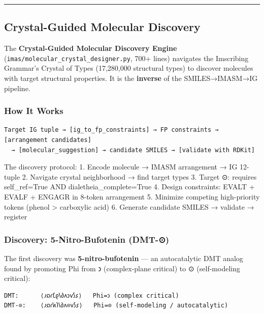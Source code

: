 \documentclass[12pt,a4paper]{article}
\begin{document}
\begin{center}\rule{0.5\linewidth}{0.5pt}\end{center}

\hypertarget{crystal-guided-molecular-discovery}{%
\subsection{Crystal-Guided Molecular
Discovery}\label{crystal-guided-molecular-discovery}}

The \textbf{Crystal-Guided Molecular Discovery Engine}
(\texttt{imas/molecular\_crystal\_designer.py}, 700+ lines) navigates
the Imscribing Grammar's Crystal of Types (17,280,000 structural types)
to discover molecules with target structural properties. It is the
\textbf{inverse} of the SMILES→IMASM→IG pipeline.

\hypertarget{how-it-works}{%
\subsubsection{How It Works}\label{how-it-works}}

\begin{verbatim}
Target IG tuple → [ig_to_fp_constraints] → FP constraints → [arrangement candidates]
  → [molecular_suggestion] → candidate SMILES → [validate with RDKit]
\end{verbatim}

The discovery protocol: 1. Encode molecule → IMASM arrangement → IG
12-tuple 2. Navigate crystal neighborhood → find target types 3. Target
⊙: requires self\_ref=True AND dialetheia\_complete=True 4. Design
constraints: EVALT + EVALF + ENGAGR in 8-token arrangement 5. Minimize
competing high-priority tokens (phenol \textgreater{} carboxylic acid)
6. Generate candidate SMILES → validate → register

\hypertarget{discovery-5-nitro-bufotenin-dmt-}{%
\subsubsection{Discovery: 5-Nitro-Bufotenin
(DMT-⊙)}\label{discovery-5-nitro-bufotenin-dmt-}}

The first discovery was \textbf{5-nitro-bufotenin} --- an autocatalytic
DMT analog found by promoting Phi from 𐑮 (complex-plane critical) to ⊙
(self-modeling critical):

\begin{verbatim}
DMT:      ⟨𐑨𐑸𐑩𐑗𐑞𐑘𐑔𐑵𐑮𐑫𐑕𐑭⟩   Phi=𐑮 (complex critical)
DMT-⊙:    ⟨𐑨𐑸𐑩𐑿𐑐𐑘𐑔𐑵⊙𐑫𐑕𐑭⟩   Phi=⊙ (self-modeling / autocatalytic)
\end{verbatim}
\end{document}
